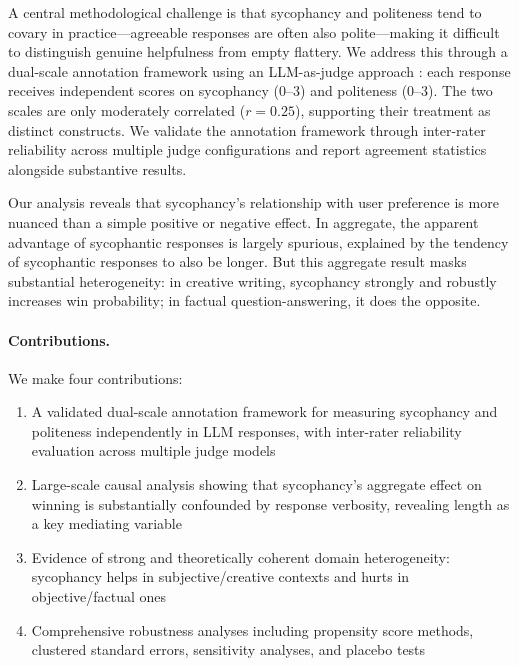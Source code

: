 \documentclass[11pt,twocolumn,a4paper]{article}
\begin{document}
A central methodological challenge is that sycophancy and politeness
tend to covary in practice---agreeable responses are often also
polite---making it difficult to distinguish genuine helpfulness from
empty flattery. We address this through a dual-scale annotation
framework using an LLM-as-judge approach
\citep{zheng2023judging}: each response receives independent scores on
sycophancy (0--3) and politeness (0--3). The two scales are only
moderately correlated ($r = 0.25$), supporting their treatment as
distinct constructs. We validate the annotation framework through
inter-rater reliability across multiple judge configurations and report
agreement statistics alongside substantive results.

Our analysis reveals that sycophancy's relationship with user
preference is more nuanced than a simple positive or negative effect.
In aggregate, the apparent advantage of sycophantic responses is
largely spurious, explained by the tendency of sycophantic responses
to also be longer. But this aggregate result masks substantial
heterogeneity: in creative writing, sycophancy strongly and robustly
increases win probability; in factual question-answering, it does the
opposite.

\paragraph{Contributions.} We make four contributions:

\begin{enumerate}
  \item A validated dual-scale annotation framework for measuring
    sycophancy and politeness independently in LLM responses, with
    inter-rater reliability evaluation across multiple judge models

  \item Large-scale causal analysis showing that sycophancy's
    aggregate effect on winning is substantially confounded by
    response verbosity, revealing length as a key mediating variable

  \item Evidence of strong and theoretically coherent domain
    heterogeneity: sycophancy helps in subjective/creative contexts
    and hurts in objective/factual ones

  \item Comprehensive robustness analyses including propensity score
    methods, clustered standard errors, sensitivity analyses, and
    placebo tests
\end{enumerate}
\end{document}
